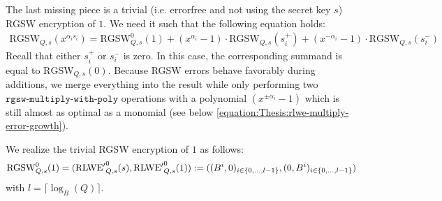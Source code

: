 \documentclass[letterpaper,10pt,english]{jupyterBook}
\begin{document}
\begin{DUlineblock}{0em}
\item[] 
\end{DUlineblock}

\sphinxAtStartPar
The last missing piece is a trivial (i.e. error\sphinxhyphen{}free and not using the secret key \(s\)) RGSW encryption of \(1\).
We need it such that the following equation holds:
\begin{equation*}
\begin{split}\mathrm{RGSW}_{Q,s}(x^{\alpha_i s_i}) = \mathrm{RGSW}_{Q,s}^0(1) + (x^{\alpha_i}-1)\cdot \mathrm{RGSW}_{Q,s}(s_i^+) + (x^{-\alpha_i}-1)\cdot \mathrm{RGSW}_{Q,s}(s_i^-)\end{split}
\end{equation*}
\sphinxAtStartPar
Recall that either \(s_i^+\) or \(s_i^-\) is zero.
In this case, the corresponding summand is equal to \(\mathrm{RGSW}_{Q,s}(0)\).
Because RGSW errors behave favorably during additions, we merge everything into the result while only performing two \(\texttt{rgsw-multiply-with-poly}\) operations with a polynomial \((x^{\pm \alpha_i}-1)\) which is still almost as optimal as a monomial (see below \eqref{equation:Thesis:rlwe-multiply-error-growth}).

\sphinxAtStartPar
We realize the trivial RGSW encryption of \(1\) as follows:
\begin{equation*}
\begin{split}\mathrm{RGSW}_{Q,s}^0(1) = (\mathrm{RLWE'}_{Q,s}^0(s), \mathrm{RLWE'}_{Q,s}^0(1)) := ((B^i,0)_{i\in \{0,\dots,l-1\}}, (0,B^i)_{i\in \{0,\dots,l-1\}})\end{split}
\end{equation*}
\sphinxAtStartPar
with \(l = \lceil \log_B(Q) \rceil\).
\end{document}
